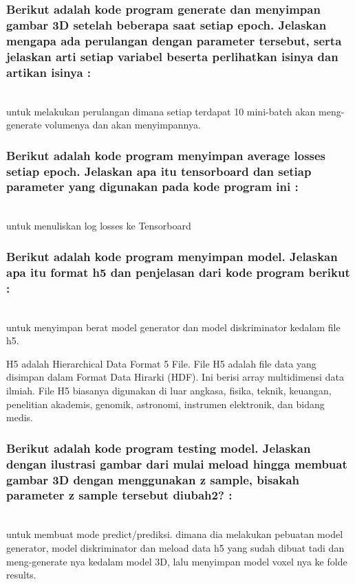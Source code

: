 \subsubsection{Berikut adalah kode program generate dan menyimpan gambar 3D setelah beberapa saat setiap epoch. Jelaskan mengapa ada perulangan dengan parameter tersebut, serta jelaskan arti setiap variabel beserta perlihatkan isinya dan artikan isinya :}
\hfill\\

untuk melakukan perulangan dimana setiap terdapat 10 mini-batch akan meng-generate volumenya dan akan menyimpannya.


\subsubsection{Berikut adalah kode program menyimpan average losses setiap epoch. Jelaskan apa itu tensorboard dan setiap parameter yang digunakan pada kode program ini :}
\hfill\\

untuk menuliskan log losses ke Tensorboard

\subsubsection{Berikut adalah kode program menyimpan model. Jelaskan apa itu format h5 dan penjelasan dari kode program berikut :}
\hfill\\

untuk menyimpan berat model generator dan model diskriminator kedalam file h5.

H5 adalah Hierarchical Data Format 5 File.
File H5 adalah file data yang disimpan dalam Format Data Hirarki (HDF). Ini berisi array multidimensi data ilmiah. File H5 biasanya digunakan di luar angkasa, fisika, teknik, keuangan, penelitian akademis, genomik, astronomi, instrumen elektronik, dan bidang medis.

\subsubsection{Berikut adalah kode program testing model. Jelaskan dengan ilustrasi gambar dari mulai meload hingga membuat gambar 3D dengan menggunakan z sample, bisakah parameter z sample tersebut diubah2? :}
\hfill\\

untuk membuat mode predict/prediksi. dimana dia melakukan pebuatan model generator, model diskriminator dan meload data h5 yang sudah dibuat tadi dan meng-generate nya kedalam model 3D, lalu menyimpan model voxel nya ke folde results.

